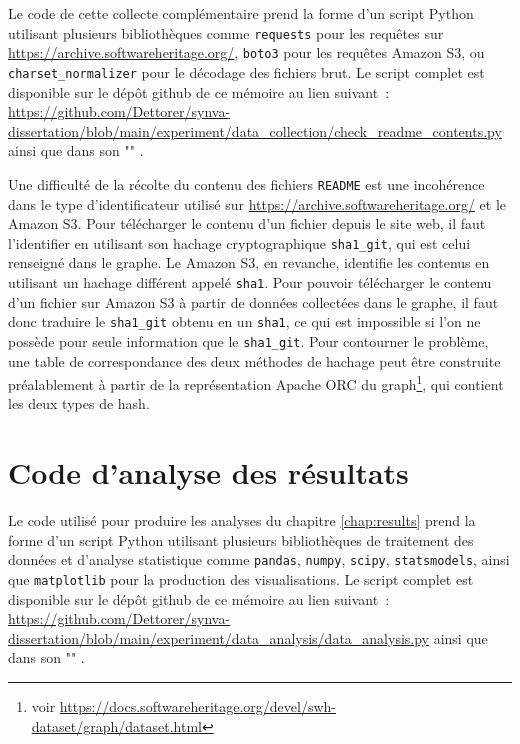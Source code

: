 Le code de cette collecte complémentaire prend la forme d'un script Python utilisant plusieurs bibliothèques
comme \texttt{requests} pour les requêtes sur \url{https://archive.softwareheritage.org/}, \texttt{boto3} pour
les requêtes Amazon S3, ou \texttt{charset\_normalizer} pour le décodage des fichiers brut. Le script complet
est disponible sur le dépôt \gls{github} de ce mémoire au lien suivant :
\url{https://github.com/Dettorer/synva-dissertation/blob/main/experiment/data_collection/check_readme_contents.py}
ainsi que dans son "" \parencite{replication-package}.

Une difficulté de la récolte du contenu des fichiers \texttt{README} est une incohérence dans le type
d'identificateur utilisé sur \url{https://archive.softwareheritage.org/} et le  Amazon S3. Pour
télécharger le contenu d'un fichier depuis le site web, il faut l'identifier en utilisant son hachage
cryptographique \texttt{sha1\_git}, qui est celui renseigné dans le graphe. Le  Amazon S3, en
revanche, identifie les contenus en utilisant un hachage différent appelé \texttt{sha1}. Pour pouvoir
télécharger le contenu d'un fichier sur Amazon S3 à partir de données collectées dans le graphe, il faut donc
traduire le \texttt{sha1\_git} obtenu en un \texttt{sha1}, ce qui est impossible si l'on ne possède pour seule
information que le \texttt{sha1\_git}. Pour contourner le problème, une table de correspondance des deux
méthodes de hachage peut être construite préalablement à partir de la représentation Apache ORC du
graph\footnote{voir \url{https://docs.softwareheritage.org/devel/swh-dataset/graph/dataset.html}}, qui
contient les deux types de hash.

\section{Code d'analyse des résultats}
\label{app:analysis.py}

Le code utilisé pour produire les analyses du chapitre \ref{chap:results} prend la forme d'un script Python
utilisant plusieurs bibliothèques de traitement des données et d'analyse statistique comme \texttt{pandas},
\texttt{numpy}, \texttt{scipy}, \texttt{statsmodels}, ainsi que \texttt{matplotlib} pour la production des
visualisations. Le script complet est disponible sur le dépôt \gls{github} de ce mémoire au lien suivant :
\url{https://github.com/Dettorer/synva-dissertation/blob/main/experiment/data_analysis/data_analysis.py}
ainsi que dans son "" \parencite{replication-package}.
